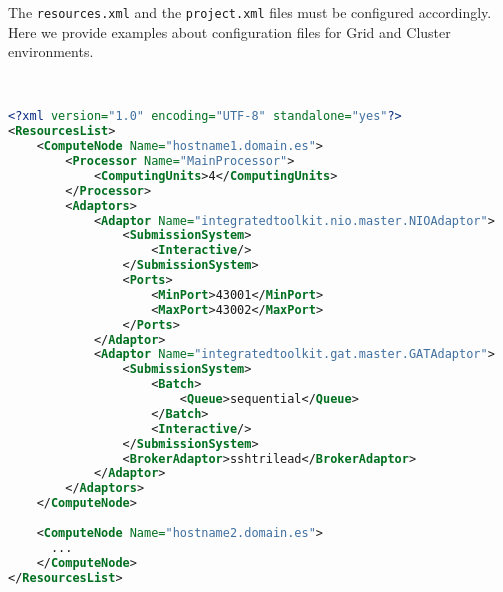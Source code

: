 The \texttt{resources.xml} and the \texttt{project.xml} files must be configured accordingly.
Here we provide examples about configuration files for Grid and Cluster environments.

~ \newline

\begin{lstlisting}[language=xml]
<?xml version="1.0" encoding="UTF-8" standalone="yes"?>                                                                                                                                                            
<ResourcesList>                                                                                                                                                                                                    
    <ComputeNode Name="hostname1.domain.es">                                                                                                                                                                       
        <Processor Name="MainProcessor">                                                                                                                                                                           
            <ComputingUnits>4</ComputingUnits>                                                                                                                                                                     
        </Processor>                                                                                                                                                                                               
        <Adaptors>                                                                                                                                                                                                 
            <Adaptor Name="integratedtoolkit.nio.master.NIOAdaptor">                                                                                                                                               
                <SubmissionSystem>
                    <Interactive/>
                </SubmissionSystem>
                <Ports>
                    <MinPort>43001</MinPort>
                    <MaxPort>43002</MaxPort>
                </Ports>
            </Adaptor>
            <Adaptor Name="integratedtoolkit.gat.master.GATAdaptor">
                <SubmissionSystem>
                    <Batch>
                        <Queue>sequential</Queue>
                    </Batch>
                    <Interactive/>
                </SubmissionSystem>
                <BrokerAdaptor>sshtrilead</BrokerAdaptor>
            </Adaptor>
        </Adaptors>
    </ComputeNode>
    
    <ComputeNode Name="hostname2.domain.es">
      ...
    </ComputeNode>
</ResourcesList>
\end{lstlisting}

